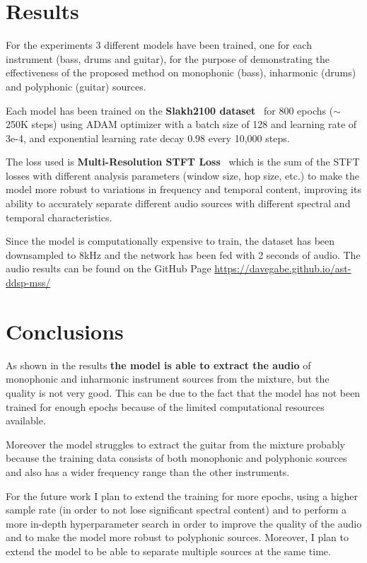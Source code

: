 \documentclass{article}
\begin{document}
\section{Results}
For the experiments 3 different models have been trained, one for each instrument (bass, drums and guitar), for the purpose of
demonstrating the effectiveness of the proposed method on monophonic (bass), inharmonic (drums) and polyphonic (guitar) sources.

Each model has been trained on the \textbf{Slakh2100 dataset}~\cite{manilow2019cutting} for 800 epochs (\(\sim \)250K steps) using
ADAM optimizer with a batch size of 128 and learning rate of 3e-4, and exponential learning rate decay 0.98 every 10,000 steps.

The loss used is \textbf{Multi-Resolution STFT Loss}~\cite{steinmetz2020auraloss} which is the sum of the STFT losses
with different analysis parameters (window size, hop size, etc.) to make the model more robust to variations in frequency and temporal content,
improving its ability to accurately separate different audio sources with different spectral and temporal characteristics.


Since the model is computationally expensive to train, the dataset has been downsampled to 8kHz and the network has been fed with 2 seconds of audio.
The audio results can be found on the GitHub Page \url{https://davegabe.github.io/ast-ddsp-mss/}


\section{Conclusions}
As shown in the results \textbf{the model is able to extract the audio} of monophonic and inharmonic instrument sources from the mixture, but the quality is not very good.
This can be due to the fact that the model has not been trained for enough epochs because of the limited computational resources available.

Moreover the model struggles to extract the guitar from the mixture probably because the training data consists of both monophonic and
polyphonic sources and also has a wider frequency range than the other instruments.

For the future work I plan to extend the training for more epochs, using a higher sample rate (in order to not lose significant spectral content)
and to perform a more in-depth hyperparameter search in order to improve the quality of the audio and to make the model more robust to polyphonic sources.
Moreover, I plan to extend the model to be able to separate multiple sources at the same time.





\end{document}
